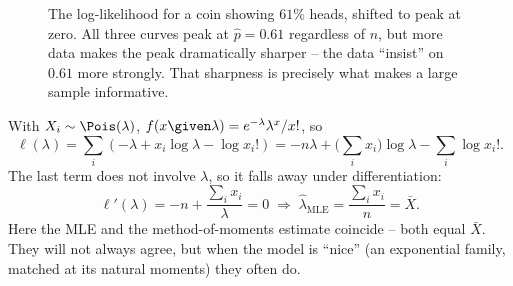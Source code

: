 \begin{figure}[H]
\centering
{}
\caption{The log-likelihood for a coin showing $61\%$ heads, shifted to peak at
zero. All three curves peak at $\hat p = 0.61$ regardless of $n$, but more data
makes the peak dramatically sharper -- the data ``insist'' on $0.61$ more
strongly. That sharpness is precisely what makes a large sample informative.}
\label{ch30:fig-loglik-bern}
\end{figure}

\begin{example}
\label{ch30:ex-mle-pois}
With $X_i\sim\Pois(\lambda)$, $f(x\given\lambda)=e^{-\lambda}\lambda^x/x!$, so
\[
  \ell(\lambda) = \sum_i \left(-\lambda + x_i\log\lambda - \log x_i!\right)
  = -n\lambda + \Big(\sum_i x_i\Big)\log\lambda - \sum_i \log x_i!.
\]
The last term does not involve $\lambda$, so it falls away under
differentiation:
\[
  \ell'(\lambda) = -n + \frac{\sum_i x_i}{\lambda} = 0
  \;\Longrightarrow\;
  \hat\lambda_{\mathrm{MLE}} = \frac{\sum_i x_i}{n} = \bar X.
\]
Here the MLE and the method-of-moments estimate coincide -- both equal $\bar X$.
They will not always agree, but when the model is ``nice'' (an exponential
family, matched at its natural moments) they often do.
\end{example}

